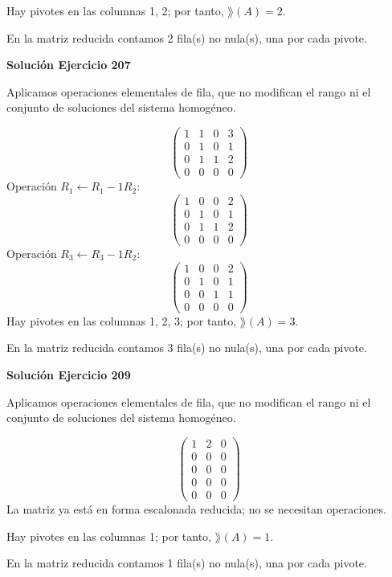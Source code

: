 Hay pivotes en las columnas 1, 2; por tanto, $\boxed{\rang(A)=2}$.

En la matriz reducida contamos 2 fila(s) no nula(s), una por cada pivote.


\par\bigskip\noindent\textbf{Solución Ejercicio 207}\par\nobreak
Aplicamos operaciones elementales de fila, que no modifican el rango ni el conjunto de soluciones del sistema homogéneo.

\[
\begin{pmatrix}1&1&0&3\\0&1&0&1\\0&1&1&2\\0&0&0&0\end{pmatrix}
\]
Operación $R_{1}\leftarrow R_{1}-1R_{2}$:
\[
\begin{pmatrix}1&0&0&2\\0&1&0&1\\0&1&1&2\\0&0&0&0\end{pmatrix}
\]
Operación $R_{3}\leftarrow R_{3}-1R_{2}$:
\[
\begin{pmatrix}1&0&0&2\\0&1&0&1\\0&0&1&1\\0&0&0&0\end{pmatrix}
\]
Hay pivotes en las columnas 1, 2, 3; por tanto, $\boxed{\rang(A)=3}$.

En la matriz reducida contamos 3 fila(s) no nula(s), una por cada pivote.


\par\bigskip\noindent\textbf{Solución Ejercicio 209}\par\nobreak
Aplicamos operaciones elementales de fila, que no modifican el rango ni el conjunto de soluciones del sistema homogéneo.

\[
\begin{pmatrix}1&2&0\\0&0&0\\0&0&0\\0&0&0\\0&0&0\end{pmatrix}
\]
La matriz ya está en forma escalonada reducida; no se necesitan operaciones.

Hay pivotes en las columnas 1; por tanto, $\boxed{\rang(A)=1}$.

En la matriz reducida contamos 1 fila(s) no nula(s), una por cada pivote.



